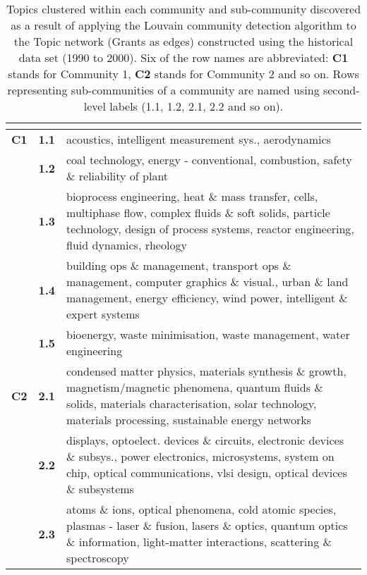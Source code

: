 \begin{spacing}{0.9}
\begin{longtable}[r]{r|r|p{11.5cm}}
\caption[Topics clustered within each community and sub-community discovered in the Topic network (Grants as edges) constructed using the historical data set (1990 to 2000)]{Topics clustered within each community and sub-community discovered as a result of applying the Louvain community detection algorithm to the Topic network (Grants as edges) constructed using the historical data set (1990 to 2000). Six of the row names are abbreviated: \textbf{C1} stands for Community 1, \textbf{C2} stands for Community 2 and so on. Rows representing sub-communities of a community are named using second-level labels (1.1, 1.2, 2.1, 2.2 and so on).}\\
\label{table:topic_a_historical2_clusters_appendix}
{} & {}\\
\hline
\endhead
\textbf{C1}
& \textbf{1.1} & {acoustics, intelligent measurement sys., aerodynamics}\\
& \textbf{1.2} & {coal technology, energy - conventional, combustion, safety \& reliability of plant}\\
& \textbf{1.3} & {bioprocess engineering, heat \& mass transfer, cells, multiphase flow, complex fluids \& soft solids, particle technology, design of process systems, reactor engineering, fluid dynamics, rheology}\\
& \textbf{1.4} & {building ops \& management, transport ops \& management, computer graphics \& visual., urban \& land management, energy efficiency, wind power, intelligent \& expert systems}\\
& \textbf{1.5} & {bioenergy, waste minimisation, waste management, water engineering}\\
\hline
\textbf{C2}
& \textbf{2.1} & {condensed matter physics, materials synthesis \& growth, magnetism/magnetic phenomena, quantum fluids \& solids, materials characterisation, solar technology, materials processing, sustainable energy networks}\\
& \textbf{2.2} & {displays, optoelect. devices \& circuits, electronic devices \& subsys., power electronics, microsystems, system on chip, optical communications, vlsi design, optical devices \& subsystems}\\
& \textbf{2.3} & {atoms \& ions, optical phenomena, cold atomic species, plasmas - laser \& fusion, lasers \& optics, quantum optics \& information, light-matter interactions, scattering \& spectroscopy}\\

\end{longtable}
\end{spacing}
